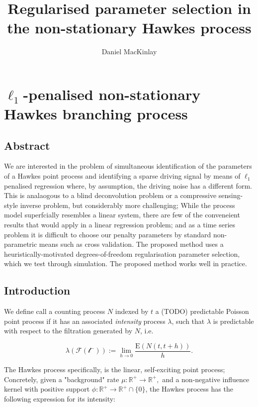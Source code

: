 \documentclass[11pt]{article}
\title{Regularised parameter selection in the non-stationary Hawkes process}
\author{Daniel MacKinlay}
\begin{document}
    
    
    \maketitle
    
    

    
    \section{$\ell_1$-penalised non-stationary Hawkes branching
process}\label{ellux5f1-penalised-non-stationary-hawkes-branching-process}





    \subsection{Abstract}\label{abstract}

We are interested in the problem of simultaneous identification of the
parameters of a Hawkes point process and identifying a sparse driving
signal by means of $\ell_1$ penalised regression where, by assumption,
the driving noise has a different form. This is analaogous to a blind
deconvolution problem or a compressive sensing-style inverse problem,
but considerably more challenging; While the process model superfcially
resembles a linear system, there are few of the conveneient results that
would apply in a linear regression problem; and as a time series problem
it is difficult to choose our penalty parameters by standard
non-parametric means such as cross validation. The proposed method uses
a heuristically-motivated degrees-of-freedom regularisation parameter
selection, which we test through simulation. The proposed method works
well in practice.

    \subsection{Introduction}\label{introduction}

We define call a counting process $N$ indexed by $t$ a (TODO)
predictable Poisson point process if it has an associated
\emph{intensity} process $\lambda$, such that $\lambda$ is predictable
with respect to the filtration generated by $N$, i.e.

\[\lambda(\mathcal{F(t^-)}):=\lim_{h\to 0} \frac{\mathrm E\left(N(t,t+h)\right)}{h}.\]

The Hawkes process \cite{hawkes_point_1971} specifically, is the linear,
self-exciting point process; Concretely, given a "background" rate
$\mu:\mathbb{R}^+\rightarrow\mathbb{R}^+,$ and a non-negative influence
kernel with positive support
$\phi:\mathbb{R}^+\rightarrow\mathbb{R}^+\cap\{0\}$, the Hawkes process
has the following expression for its intensity:
\end{document}
